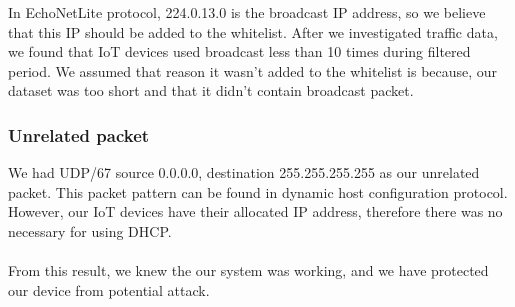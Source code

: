 In EchoNetLite protocol, 224.0.13.0 is the broadcast IP address, so we believe that this IP should be added to the whitelist. After we investigated traffic data, we found that IoT devices used broadcast less than 10 times during filtered period. We assumed that reason it wasn’t added to the whitelist is because, our dataset was too short and that it didn’t contain broadcast packet.  

\subsubsection{Unrelated packet}  
We had UDP/67 source 0.0.0.0, destination 255.255.255.255 as our unrelated packet. This packet pattern can be found in dynamic host configuration protocol. However, our IoT devices have their allocated IP address, therefore there was no necessary for using DHCP.
\\ \\
From this result, we knew the our system was working, and we have protected our device from potential attack.
 